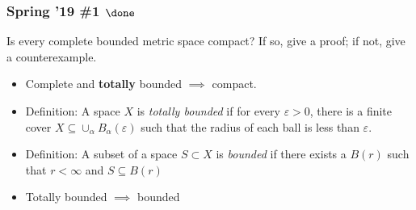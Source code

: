 \hypertarget{spring-19-1-done}{%
\subsubsection{\texorpdfstring{Spring '19 \#1
\(\done\)}{Spring '19 \#1 \textbackslash done}}\label{spring-19-1-done}}

\begin{problem}[?]

Is every complete bounded metric space compact? If so, give a proof; if
not, give a counterexample.

\end{problem}


\begin{solution}

\envlist

\begin{concept}

\envlist

\begin{itemize}
\item
  Complete and \textbf{totally} bounded \(\implies\) compact.
\item
  Definition: A space \(X\) is \emph{totally bounded} if for every
  \(\varepsilon >0\), there is a finite cover
  \(X \subseteq \cup_\alpha B_\alpha(\varepsilon)\) such that the radius
  of each ball is less than \(\varepsilon\).
\item
  Definition: A subset of a space \(S \subset X\) is \emph{bounded} if
  there exists a \(B(r)\) such that \(r<\infty\) and
  \(S \subseteq B(r)\)
\item
  Totally bounded \(\implies\) bounded


\end{itemize}
\end{concept}
\end{solution}
